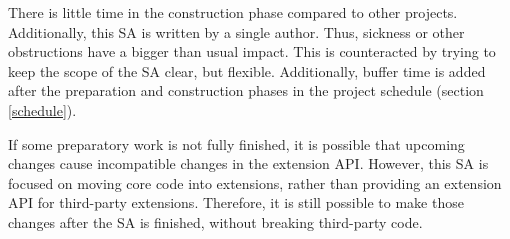 There is little time in the construction phase compared to other projects.
Additionally, this SA is written by a single author. Thus, sickness or other
obstructions have a bigger than usual impact. This is counteracted by trying to
keep the scope of the SA clear, but flexible. Additionally, buffer time is
added after the preparation and construction phases in the project schedule
(section \ref{schedule}).

If some preparatory work is not fully finished, it is possible that upcoming
changes cause incompatible changes in the extension API. However, this SA
is focused on moving core code into extensions, rather than providing an
extension API for third-party extensions. Therefore, it is still possible to make
those changes after the SA is finished, without breaking third-party code.